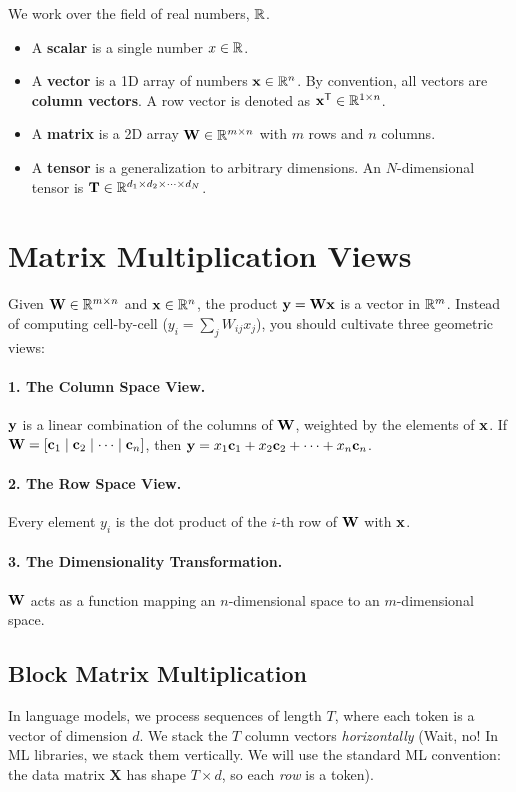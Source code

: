 We work over the field of real numbers, $\mathbb{R}$.
\begin{itemize}
    \item A \textbf{scalar} is a single number $x \in \mathbb{R}$.
    \item A \textbf{vector} is a 1D array of numbers $\mathbf{x} \in \mathbb{R}^n$. By convention, all vectors are \textbf{column vectors}. A row vector is denoted as $\mathbf{x}^{\mathsf{T}} \in \mathbb{R}^{1 \times n}$.
    \item A \textbf{matrix} is a 2D array $\mathbf{W} \in \mathbb{R}^{m \times n}$ with $m$ rows and $n$ columns. 
    \item A \textbf{tensor} is a generalization to arbitrary dimensions. An $N$-dimensional tensor is $\mathbf{T} \in \mathbb{R}^{d_1 \times d_2 \times \dots \times d_N}$.
\end{itemize}

\section{Matrix Multiplication Views}
\label{ch:02:sec:main}

Given $\mathbf{W} \in \mathbb{R}^{m \times n}$ and $\mathbf{x} \in \mathbb{R}^n$, the product $\mathbf{y} = \mathbf{W}\mathbf{x}$ is a vector in $\mathbb{R}^m$. 
Instead of computing cell-by-cell ($y_i = \sum_j W_{ij} x_j$), you should cultivate three geometric views:

\paragraph{1. The Column Space View.} $\mathbf{y}$ is a linear combination of the columns of $\mathbf{W}$, weighted by the elements of $\mathbf{x}$. If $\mathbf{W} = [\mathbf{c}_1 \mid \mathbf{c}_2 \mid \dots \mid \mathbf{c}_n]$, then $\mathbf{y} = x_1\mathbf{c}_1 + x_2\mathbf{c}_2 + \dots + x_n\mathbf{c}_n$.
\paragraph{2. The Row Space View.} Every element $y_i$ is the dot product of the $i$-th row of $\mathbf{W}$ with $\mathbf{x}$.
\paragraph{3. The Dimensionality Transformation.} $\mathbf{W}$ acts as a function mapping an $n$-dimensional space to an $m$-dimensional space.

\subsection{Block Matrix Multiplication}
In language models, we process sequences of length $T$, where each token is a vector of dimension $d$. We stack the $T$ column vectors \emph{horizontally} (Wait, no! In ML libraries, we stack them vertically. We will use the standard ML convention: the data matrix $\mathbf{X}$ has shape $T \times d$, so each \emph{row} is a token).

